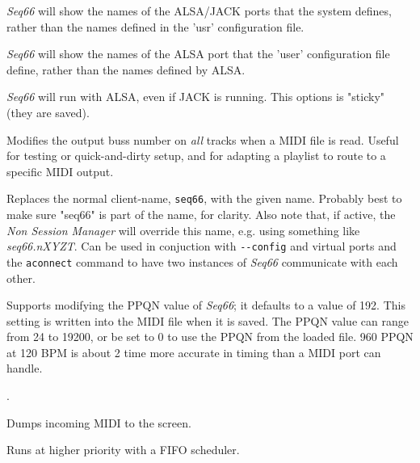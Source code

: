 
      \textsl{Seq66} will show the names of the ALSA/JACK ports that the system
      defines, rather than the names defined in the 'usr' configuration file.

      \textsl{Seq66} will show the names of the ALSA port that the 'user'
      configuration file define, rather than the names defined by ALSA.



      \textsl{Seq66} will run with ALSA, even if JACK is running.
      This options is "sticky" (they are saved).

      Modifies the output buss number on \textsl{all} tracks when a MIDI file is
      read. Useful for testing or quick-and-dirty setup, and for adapting a
      playlist to route to a specific MIDI output.

      Replaces the normal client-name, \texttt{seq66}, with the given name.
      Probably best to make sure "seq66" is part of the name, for clarity.
      Also note that, if active, the \textsl{Non Session Manager} will override
      this name, e.g. using something like \textsl{seq66.nXYZT}.
      Can be used in conjuction with \texttt{-{}-config} and virtual ports
      and the \texttt{aconnect} command
      to have two instances of \textsl{Seq66} communicate with each
      other.

      Supports modifying the PPQN value of \textsl{Seq66}; it
      defaults to a value of 192.  This setting
      is written into the MIDI file when it is saved.
      The PPQN value can range from 24 to 19200, or
      be set to 0 to use the PPQN from the loaded file.
      960 PPQN at 120 BPM is about 2 time more accurate in timing
      than a MIDI port can handle.

      .


      Dumps incoming MIDI to the screen.

      Runs at higher priority with a FIFO scheduler.

